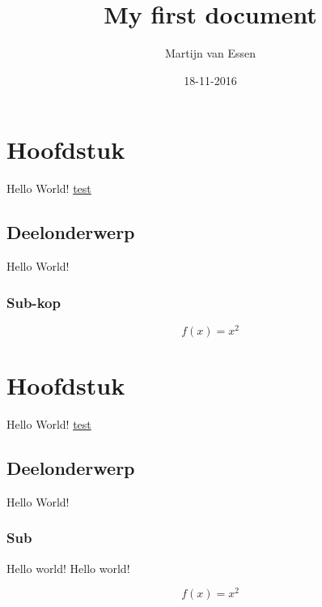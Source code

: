 \documentclass[numbers=endperiod]{scrartcl}
\title{My first document}
\date{18-11-2016}
\author{Martijn van Essen}
\begin{document}
	\maketitle
	\newpage
	
	\section{Hoofdstuk}
	Hello World!
	\underline{test}
	\subsection{Deelonderwerp}
	Hello World!
	\subsubsection{Sub-kop}
	\newpage
	
	\begin{equation}
		f(x) = x^2
	\end{equation}
	
	\section{Hoofdstuk}
	Hello World!
	\underline{test}
	\subsection{Deelonderwerp}
	Hello World!
	\subsubsection{Sub}
	Hello world!
	Hello world!
	
	\newpage
	
	\begin{equation}
	f(x) = x^2
	\end{equation}
	
\end{document}
